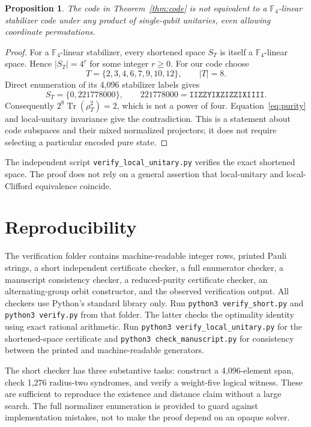 \documentclass[11pt]{article}
\newtheorem{proposition}[theorem]{Proposition}
\newcommand{\F}{\mathbb F}
\begin{document}
\begin{proposition}\label{prop:LU}
The code in Theorem~\ref{thm:code} is not equivalent to a $\F_4$-linear stabilizer code under any product of single-qubit unitaries, even allowing coordinate permutations.
\end{proposition}
\begin{proof}
For a $\F_4$-linear stabilizer, every shortened space $S_T$ is itself a $\F_4$-linear space. Hence $|S_T|=4^r$ for some integer $r\ge0$. For our code choose
\[
 T=\{2,3,4,6,7,9,10,12\},\qquad |T|=8.
\]
Direct enumeration of its 4,096 stabilizer labels gives
\[
 S_T=\{0,221778000\},\qquad
 221778000=\texttt{IIZZYIXZIZZIXIIII}.
\]
Consequently $2^8\operatorname{Tr}(\rho_T^2)=2$, which is not a power of four. Equation~\eqref{eq:purity} and local-unitary invariance give the contradiction. This is a statement about code subspaces and their mixed normalized projectors; it does not require selecting a particular encoded pure state.
\end{proof}
The independent script \texttt{verify\_local\_unitary.py} verifies the exact shortened space. The proof does not rely on a general assertion that local-unitary and local-Clifford equivalence coincide.

\section{Reproducibility}
The verification folder contains machine-readable integer rows, printed Pauli strings, a short independent certificate checker, a full enumerator checker, a manuscript consistency checker, a reduced-purity certificate checker, an alternating-group orbit constructor, and the observed verification output. All checkers use Python's standard library only. Run \texttt{python3 verify\_short.py} and \texttt{python3 verify.py} from that folder. The latter checks the optimality identity using exact rational arithmetic. Run \texttt{python3 verify\_local\_unitary.py} for the shortened-space certificate and \texttt{python3 check\_manuscript.py} for consistency between the printed and machine-readable generators.

The short checker has three substantive tasks: construct a 4,096-element span, check 1,276 radius-two syndromes, and verify a weight-five logical witness. These are sufficient to reproduce the existence and distance claim without a large search. The full normalizer enumeration is provided to guard against implementation mistakes, not to make the proof depend on an opaque solver.
\end{document}
